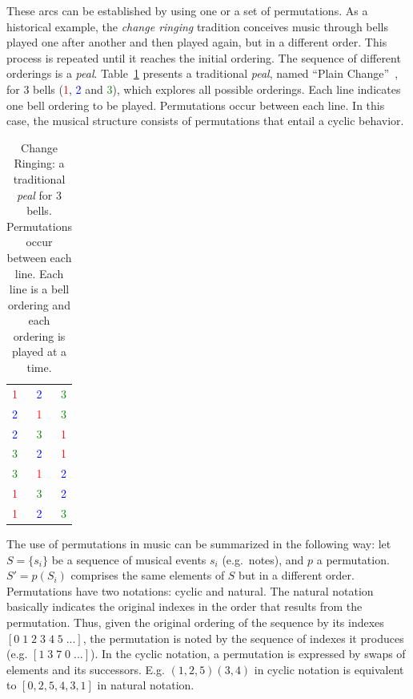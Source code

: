 \documentclass[format=acmsmall, review=false, screen=true]{acmart}
\begin{document}
These arcs can be established by using one or a set of permutations.
As a historical
example, the \emph{change ringing} tradition conceives music through
bells played one after another and then played again, but in a different
order. This process is repeated until it reaches the initial ordering. The sequence of
different orderings is a \emph{peal}. Table~\ref{tab:change}
presents a traditional \emph{peal}, named ``Plain Change''~\cite{change}, for 3 bells (\textcolor{red}{1}, \textcolor{blue}{2} and \textcolor{green}{3}), which explores
all possible orderings. Each line indicates one bell ordering to be
played. Permutations occur between each line. In this case, the musical structure
consists of permutations that entail a cyclic behavior.

\begin{table}[htp!]
\centering
\caption{Change Ringing: a traditional \emph{peal} for 3 bells. Permutations
occur between each line. Each line is a bell ordering and each ordering is played at a time.} 
\begin{tabular}{l c r}
\textcolor{red}{1} & \textcolor{blue}{2} & \textcolor{green}{3} \\
\textcolor{blue}{2} & \textcolor{red}{1} & \textcolor{green}{3} \\
\textcolor{blue}{2} & \textcolor{green}{3} & \textcolor{red}{1} \\
\textcolor{green}{3} & \textcolor{blue}{2} & \textcolor{red}{1} \\
\textcolor{green}{3} & \textcolor{red}{1} & \textcolor{blue}{2} \\
\textcolor{red}{1} & \textcolor{green}{3} & \textcolor{blue}{2} \\
\textcolor{red}{1} & \textcolor{blue}{2} & \textcolor{green}{3}
\end{tabular}
\label{tab:change}
\end{table}

The use of permutations in music can be summarized in the following way:
let $S=\{s_i\}$ be a sequence of musical events $s_i$ (e.g.\ notes), and $p$ a
permutation. $S'=p(S_i)$ comprises the same elements of $S$ but in a
different order. Permutations have two notations: cyclic and
natural. The natural notation basically indicates the original indexes in the order that results from
the permutation. Thus, given the original ordering of the sequence by its indexes $[0\;1\;2\;3\;4\;5\;...]$, the permutation is noted by the sequence of indexes it
produces (e.g. $[1\;3\;7\;0\;...]$).
In the cyclic notation, a permutation is expressed
by swaps of elements and its successors.
E.g. $(1,2,5)(3,4)$ in cyclic notation is equivalent to $[0,2,5,4,3,1]$ in natural notation.
\end{document}
